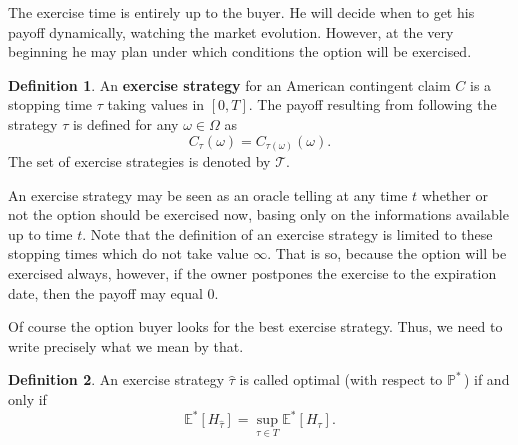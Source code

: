 \documentclass[a4paper,11pt, twoside]{book}
\theoremstyle{definition}
\newtheorem{mydef}{Definition}[chapter]
\theoremstyle{remark}
\def\Em{{\mathbb{E}^*}}
\def\Pm{{\mathbb{P}}^*\,}
\begin{document}
The exercise time is entirely up to the buyer. He will decide when to get his payoff dynamically, watching the market evolution. However, at the very beginning he may plan under which conditions the option will be exercised.
\begin{mydef}
 An \textbf{exercise strategy} for an American contingent claim $C$ is a stopping time $\tau$ taking values in $[0,T]$. The payoff resulting from following the strategy $\tau$ is defined for any $\omega \in \Omega$ as
 \[ C_{\tau}(\omega) = C_{\tau(\omega)}(\omega).\]
 The set of exercise strategies is denoted by $\mathcal{T}$. 
\end{mydef}
An exercise strategy may be seen as an oracle telling at any time $t$ whether or not the option should be exercised now, basing only on the informations available up to time $t$. Note that the definition of an exercise strategy is limited to these stopping times which do not take value $\infty$. That is so, because the option will be exercised always, however, if the owner postpones the exercise to the expiration date, then the payoff may equal 0.

Of course the option buyer looks for the best exercise strategy. Thus, we need to write precisely what we mean by that.
\begin{mydef}
 An exercise strategy $\hat{\tau}$ is called optimal (with respect to $\Pm$) if and only if
\begin{equation}
\label{eq:AM_optStrategy}
\Em[H_{\hat{\tau}}] = \sup\limits_{\tau \in T} \Em[H_{\tau}]. 
\end{equation}
\end{mydef}
\end{document}
